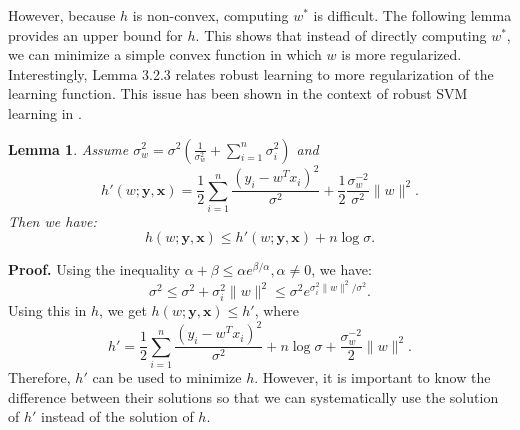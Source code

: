 \documentclass[12pt]{article}
\newtheorem{lemma}{Lemma}[section]
\begin{document}
	However, because $h$ is non-convex, computing $w^*$ is difficult. The following lemma provides an upper bound for $h$. This shows that instead of directly computing $w^*$, we can minimize a simple convex function in which $w$ is more regularized. Interestingly, Lemma 3.2.3 relates robust learning to more regularization of the learning function. This issue has been shown in the context of robust SVM learning in \cite{xu2007regularization}.
	
	\begin{lemma}
		Assume $\sigma_w^2 = \sigma^2( \frac{1}{\sigma_w^2} + \sum_{i=1}^{n} \sigma_i^2 )$ and
		\begin{equation}
			h'(w; \mathbf{y}, \mathbf{x}) = \frac{1}{2} \sum_{i=1}^{n} \frac{(y_i - w^T x_i)^2}{\sigma^2} + \frac{1}{2} \frac{\sigma_w^{-2}}{\sigma^2} \|w\|^2.
		\end{equation}
		Then we have:
		\begin{equation}
			h(w; \mathbf{y}, \mathbf{x}) \le h'(w; \mathbf{y}, \mathbf{x}) + n \log \sigma.
		\end{equation}
	\end{lemma}
	
	\textbf{Proof.} Using the inequality $\alpha + \beta \le \alpha e^{\beta/\alpha}, \alpha \neq 0$, we have:
	\begin{equation}
		\sigma^2 \le \sigma^2 + \sigma_i^2 \|w\|^2 \le \sigma^2 e^{\sigma_i^2 \|w\|^2 / \sigma^2}.
	\end{equation}
	Using this in $h$, we get $h(w; \mathbf{y}, \mathbf{x}) \le h'$, where
	\begin{equation}
		h' = \frac{1}{2} \sum_{i=1}^{n} \frac{(y_i - w^T x_i)^2}{\sigma^2} + n \log \sigma + \frac{\sigma_w^{-2}}{2} \|w\|^2.
	\end{equation}
	Therefore, $h'$ can be used to minimize $h$. However, it is important to know the difference between their solutions so that we can systematically use the solution of $h'$ instead of the solution of $h$.
	
\end{document}
